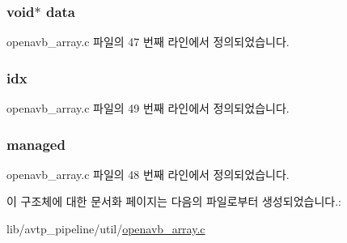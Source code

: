 \subsubsection[{\texorpdfstring{data}{data}}]{\setlength{\rightskip}{0pt plus 5cm}void$\ast$ data}\hypertarget{structopenavb__array__elem_a735984d41155bc1032e09bece8f8d66d}{}\label{structopenavb__array__elem_a735984d41155bc1032e09bece8f8d66d}


openavb\+\_\+array.\+c 파일의 47 번째 라인에서 정의되었습니다.

\subsubsection[{\texorpdfstring{idx}{idx}}]{ idx}\hypertarget{structopenavb__array__elem_acaea95a991ace601bbb6335cc78efd4a}{}\label{structopenavb__array__elem_acaea95a991ace601bbb6335cc78efd4a}


openavb\+\_\+array.\+c 파일의 49 번째 라인에서 정의되었습니다.

\subsubsection[{\texorpdfstring{managed}{managed}}]{ managed}\hypertarget{structopenavb__array__elem_a8ff69266b2f44d218fdfe0c9d6950409}{}\label{structopenavb__array__elem_a8ff69266b2f44d218fdfe0c9d6950409}


openavb\+\_\+array.\+c 파일의 48 번째 라인에서 정의되었습니다.



이 구조체에 대한 문서화 페이지는 다음의 파일로부터 생성되었습니다.\+:\begin{DoxyCompactItemize}
\item 
lib/avtp\+\_\+pipeline/util/\hyperlink{openavb__array_8c}{openavb\+\_\+array.\+c}\end{DoxyCompactItemize}
